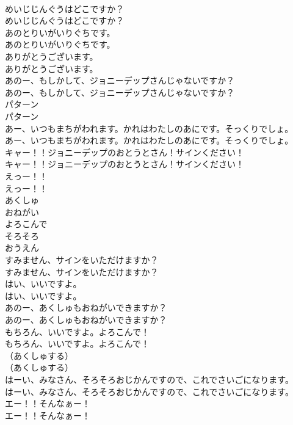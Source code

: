 \documentclass[8pt]{extreport}
\begin{document}
\begin{CJK}{UTF8}{min}
\\	めいじじんぐうはどこですか？	
\\	めいじじんぐうはどこですか？ 
\\	あのとりいがいりぐちです。	
\\	あのとりいがいりぐちです。 
\\	ありがとうございます。	
\\	ありがとうございます。 
\\	あのー、もしかして、ジョニーデップさんじゃないですか？	
\\	あのー、もしかして、ジョニーデップさんじゃないですか？
\\	パターン
\\	パターン
\\	あー、いつもまちがわれます。かれはわたしのあにです。そっくりでしょ。	
\\	あー、いつもまちがわれます。かれはわたしのあにです。そっくりでしょ。 
\\	キャー！！ジョニーデップのおとうとさん！サインください！	
\\	キャー！！ジョニーデップのおとうとさん！サインください！
\\	えっー！！	
\\	えっー！！ 
\\	あくしゅ
\\	おねがい
\\	よろこんで
\\	そろそろ
\\	おうえん
\\	すみません、サインをいただけますか？	
\\	すみません、サインをいただけますか？ 
\\	はい、いいですよ。	
\\	はい、いいですよ。 
\\	あのー、あくしゅもおねがいできますか？	
\\	あのー、あくしゅもおねがいできますか？ 
\\	もちろん、いいですよ。よろこんで！	
\\	もちろん、いいですよ。よろこんで！ 
\\	（あくしゅする）	
\\	（あくしゅする） 
\\	はーい、みなさん、そろそろおじかんですので、これでさいごになります。	
\\	はーい、みなさん、そろそろおじかんですので、これでさいごになります。 
\\	エー！！そんなぁー！	
\\	エー！！そんなぁー！ 

\end{CJK}
\end{document}
